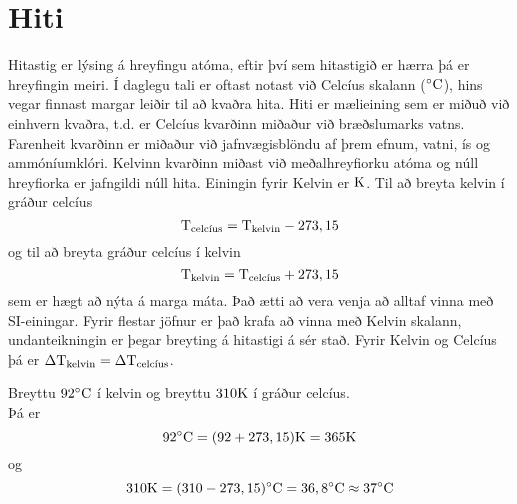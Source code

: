 \chapter{Hiti}
Hitastig er lýsing á hreyfingu atóma, eftir því sem hitastigið er hærra þá er
hreyfingin meiri. Í daglegu tali er oftast notast við Celcíus skalann ($^{\circ}\text{C}$),
hins vegar finnast margar leiðir til að kvaðra hita. Hiti er mælieining sem er
miðuð við einhvern kvaðra, t.d. er Celcíus kvarðinn miðaður við bræðslumarks
vatns. Farenheit kvarðinn er miðaður við jafnvægisblöndu af þrem efnum,
vatni, ís og ammóníumklóri. Kelvinn kvarðinn miðast við meðalhreyfiorku atóma
og núll hreyfiorka er jafngildi núll hita. Einingin fyrir Kelvin er $\text{K}$.
Til að breyta kelvin í gráður celcíus
\begin{equation}
	\text{T}_\text{celcíus} = \text{T}_\text{kelvin} - 273,15
\end{equation}
og til að breyta gráður celcíus í kelvin
\begin{equation}
	\text{T}_\text{kelvin} = \text{T}_\text{celcíus} + 273,15
\end{equation}
sem er hægt að nýta á marga máta. Það ætti að vera venja að alltaf vinna með
SI-einingar. Fyrir flestar jöfnur er það krafa að vinna með Kelvin skalann,
undanteikningin er þegar breyting á hitastigi á sér stað. Fyrir Kelvin og Celcíus
þá er $\Delta\text{T}_\text{kelvin} = \Delta\text{T}_\text{celcíus}$.

\begin{formalexample}
Breyttu $92 ^{\circ}\text{C}$ í kelvin og breyttu $310 \text{K}$ í gráður celcíus.
\\[4 ex]
Þá er
\[
	92 ^{\circ}\text{C} = (92+273,15) \text{K} = 365 \text{K}
\]
og
\[
	310 \text{K} = (310-273,15) ^{\circ}\text{C} = 36,8 ^{\circ}\text{C} \approx 37 ^{\circ}\text{C}
\]

\end{formalexample}